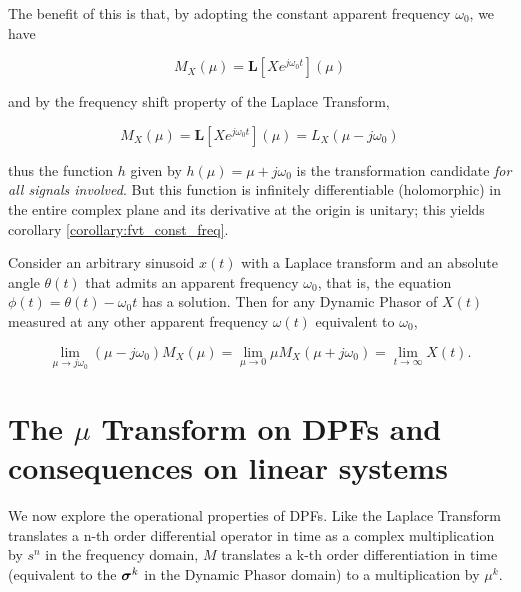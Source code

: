	The benefit of this is that, by adopting the constant apparent frequency $\omega_0$, we have

\begin{equation} M_X\left(\mu\right) = \mathbf{L}\left[Xe^{j\omega_0 t}\right]\left(\mu\right) \end{equation}

	\noindent and by the frequency shift property of the Laplace Transform,

\begin{equation} M_X\left(\mu\right) = \mathbf{L}\left[Xe^{j\omega_0 t}\right]\left(\mu\right) = L_X\left(\mu - j\omega_0\right)\end{equation}

	\noindent thus the function $h$ given by $h(\mu) = \mu + j\omega_0$ is the transformation candidate \textit{for all signals involved}. But this function is infinitely differentiable (holomorphic) in the entire complex plane and its derivative at the origin is unitary; this yields corollary \ref{corollary:fvt_const_freq}.

\begin{corollary}\label{corollary:fvt_const_freq} Consider an arbitrary sinusoid $x(t)$ with a Laplace transform and an absolute angle $\theta(t)$ that admits an apparent frequency $\omega_0$, that is, the equation $\phi(t) = \theta(t) - \omega_0 t$ has a solution. Then for any Dynamic Phasor of $X(t)$ measured at any other apparent frequency $\omega(t)$ equivalent to $\omega_0$,

\begin{equation} \lim\limits_{\mu\to j\omega_0} \left(\mu - j\omega_0\right) M_X\left(\mu\right) = \lim\limits_{\mu\to 0} \mu M_X\left(\mu + j\omega_0\right) = \lim\limits_{t\to\infty} X\left(t\right) .\end{equation}

\end{corollary}

\section{The $\mu$ Transform on DPFs and consequences on linear systems} \label{subsec:mutransf_and_dpos} %

	We now explore the operational properties of DPFs. Like the Laplace Transform translates a n-th order differential operator in time as a complex multiplication by $s^n$ in the frequency domain, $M$ translates a k-th order differentiation in time (equivalent to the $\boldsymbol{\sigma}^{k}$ in the Dynamic Phasor domain) to a multiplication by $\mu^k$.

